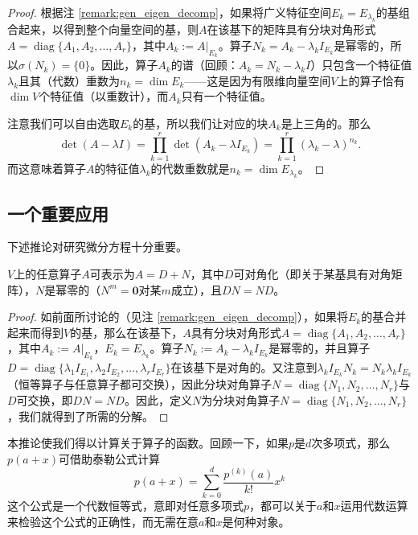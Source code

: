 \begin{proof}
    根据注 \ref{remark:gen_eigen_decomp}，如果将广义特征空间$E_k=E_{\lambda_k}$的基组合起来，以得到整个向量空间的基，则$A$在该基下的矩阵具有分块对角形式$A=\operatorname{diag}\{A_1,A_2,\dots,A_r\}$，其中$A_k:=A|_{E_k}$。算子$N_k=A_k-\lambda_k I_{E_k}$是幂零的，所以$\sigma(N_k)=\{0\}$。因此，算子$A_k$的谱（回顾：$A_k=N_k-\lambda_k I$）只包含一个特征值$\lambda_k$且其（代数）重数为$n_k=\dim E_k$——这是因为有限维向量空间$V$上的算子恰有$\dim V$个特征值（以重数计），而$A_k$只有一个特征值。
    
    注意我们可以自由选取$E_k$的基，所以我们让对应的块$A_k$是上三角的。那么
    \[\det(A-\lambda I)=\prod_{k=1}^{r}\det(A_{k}-\lambda I_{E_{k}})=\prod_{k=1}^{r}(\lambda_{k}-\lambda)^{n_{k}}.\]
    而这意味着算子$A$的特征值$\lambda_k$的代数重数就是$n_k=\dim E_{\lambda_k}$。
\end{proof}

\subsection{一个重要应用}

下述推论对研究微分方程十分重要。

\begin{corollary}
    $V$上的任意算子$A$可表示为$A=D+N$，其中$D$可对角化（即关于某基具有对角矩阵），$N$是幂零的（$N^m=\mathbf{0}$对某$m$成立），且$DN=ND$。    
\end{corollary}

\begin{proof}
    如前面所讨论的（见注 \ref{remark:gen_eigen_decomp}），如果将$E_k$的基合并起来而得到$V$的基，那么在该基下，$A$具有分块对角形式$A=\operatorname{diag}\{A_1,A_2,\dots,A_r\}$，其中$A_k:=A|_{E_k}$，$E_k=E_{\lambda_k}$。算子$N_k:=A_k-\lambda_k I_{E_k}$是幂零的，并且算子$D=\operatorname{diag}\{\lambda_1 I_{E_1},\lambda_2 I_{E_2},\dots,\lambda_r I_{E_r}\}$在该基下是对角的。又注意到$\lambda_k I_{E_k} N_k=N_k \lambda_k I_{E_k}$（恒等算子与任意算子都可交换），因此分块对角算子$N=\operatorname{diag}\{N_1,N_2,\dots,N_r\}$与$D$可交换，即$DN=ND$。因此，定义$N$为分块对角算子$N=\operatorname{diag}\{N_1,N_2,\dots,N_r\}$，我们就得到了所需的分解。
\end{proof}

本推论使我们得以计算关于算子的函数。回顾一下，如果$p$是$d$次多项式，那么$p(a+x)$可借助泰勒公式计算\[p(a+x)=\sum_{k=0}^{d}{\frac{p^{(k)}(a)}{k!}}x^{k}\]
这个公式是一个代数恒等式，意即对任意多项式$p$，都可以关于$a$和$x$运用代数运算来检验这个公式的正确性，而无需在意$a$和$x$是何种对象。

